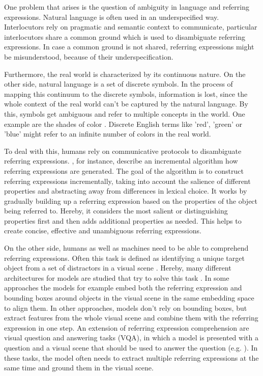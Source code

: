 One problem that arises is the question of ambiguity in language and referring expressions.
Natural language is often used in an underspecified way.
Interlocutors rely on pragmatic and semantic context to communicate, particular interlocutors share a common ground which is used to disambiguate referring expressions.
In case a common ground is not shared, referring expressions might be misunderstood, because of their underspecification.

Furthermore, the real world is characterized by its continuous nature.
On the other side, natural language is a set of discrete symbols.
In the process of mapping this continuum to the discrete symbols, information is lost, since the whole context of the real world can't be captured by the natural language.
By this, symbols get ambiguous and refer to multiple concepts in the world.
One example are the shades of color \citep{Zaslavsky2018}.
Discrete English terms like 'red', 'green' or 'blue' might refer to an infinite number of colors in the real world.

To deal with this, humans rely on communicative protocols to disambiguate referring expressions.
\citet{Dale1995}, for instance, describe an incremental algorithm how referring expressions are generated.
The goal of the algorithm is to construct referring expressions incrementally, taking into account the salience of different properties and abstracting away from differences in lexical choice.
It works by gradually building up a referring expression based on the properties of the object being referred to.
Hereby, it considers the most salient or distinguishing properties first and then adds additional properties as needed.
This helps to create concise, effective and unambiguous referring expressions.

On the other side, humans as well as machines need to be able to comprehend referring expressions.
Often this task is defined as identifying a unique target object from a set of distractors in a visual scene \citep{Mao2016}.
Hereby, many different architectures for models are studied that try to solve this task \citep{Qiao2020}.
In some approaches the models for example embed both the referring expression and bounding boxes around objects in the visual scene in the same embedding space to align them.
In other approaches, models don't rely on bounding boxes, but extract features from the whole visual scene and combine them with the referring expression in one step.
An extension of referring expression comprehension are visual question and answering tasks (VQA), in which a model is presented with a question and a visual scene that should be used to answer the question (e.g. \citep{Antol2015}).
In these tasks, the model often needs to extract multiple referring expressions at the same time and ground them in the visual scene.


